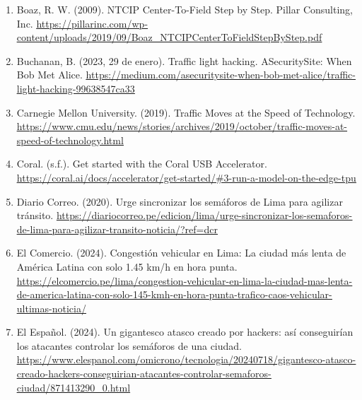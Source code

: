 \begin{enumerate}
\item
  Boaz, R. W. (2009). NTCIP Center-To-Field Step by Step. Pillar Consulting, Inc. \href{https://pillarinc.com/wp-content/uploads/2019/09/Boaz_NTCIPCenterToFieldStepByStep.pdf}{\ul{https://pillarinc.com/wp-content/uploads/2019/09/Boaz\_NTCIPCenterToFieldStepByStep.pdf}}
\item
  Buchanan, B. (2023, 29 de enero). Traffic light hacking. ASecuritySite: When Bob Met Alice. \href{https://medium.com/asecuritysite-when-bob-met-alice/traffic-light-hacking-99638547ca33}{\ul{https://medium.com/asecuritysite-when-bob-met-alice/traffic-light-hacking-99638547ca33}}
\item
  Carnegie Mellon University. (2019). Traffic Moves at the Speed of Technology. \href{https://www.cmu.edu/news/stories/archives/2019/october/traffic-moves-at-speed-of-technology.html}{\ul{https://www.cmu.edu/news/stories/archives/2019/october/traffic-moves-at-speed-of-technology.html}}
\item
  Coral. (s.f.). Get started with the Coral USB Accelerator. \href{https://coral.ai/docs/accelerator/get-started/\#3-run-a-model-on-the-edge-tpu}{\ul{https://coral.ai/docs/accelerator/get-started/\#3-run-a-model-on-the-edge-tpu}}
\item
  Diario Correo. (2020). Urge sincronizar los semáforos de Lima para agilizar tránsito. \href{https://diariocorreo.pe/edicion/lima/urge-sincronizar-los-semaforos-de-lima-para-agilizar-transito-noticia/?ref=dcr}{\ul{https://diariocorreo.pe/edicion/lima/urge-sincronizar-los-semaforos-de-lima-para-agilizar-transito-noticia/?ref=dcr}}
\item
  El Comercio. (2024). Congestión vehicular en Lima: La ciudad más lenta de América Latina con solo 1.45 km/h en hora punta. \href{https://elcomercio.pe/lima/congestion-vehicular-en-lima-la-ciudad-mas-lenta-de-america-latina-con-solo-145-kmh-en-hora-punta-trafico-caos-vehicular-ultimas-noticia/}{\ul{https://elcomercio.pe/lima/congestion-vehicular-en-lima-la-ciudad-mas-lenta-de-america-latina-con-solo-145-kmh-en-hora-punta-trafico-caos-vehicular-ultimas-noticia/}}
\item
  El Español. (2024). Un gigantesco atasco creado por hackers: así conseguirían los atacantes controlar los semáforos de una ciudad. \href{https://www.elespanol.com/omicrono/tecnologia/20240718/gigantesco-atasco-creado-hackers-conseguirian-atacantes-controlar-semaforos-ciudad/871413290_0.html}{\ul{https://www.elespanol.com/omicrono/tecnologia/20240718/gigantesco-atasco-creado-hackers-conseguirian-atacantes-controlar-semaforos-ciudad/871413290\_0.html}}

\end{enumerate}
